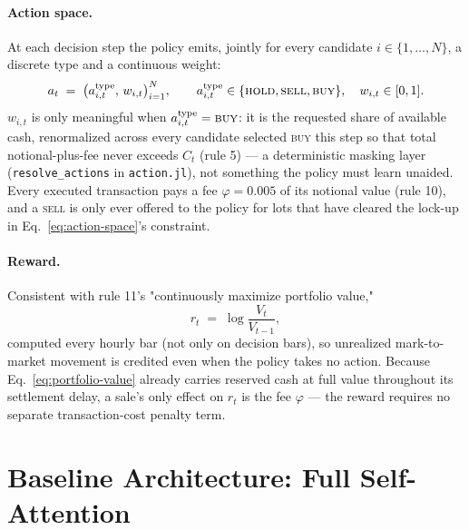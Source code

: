 \documentclass[11pt]{article}
\newcommand{\code}[1]{\texttt{#1}}
\begin{document}
\paragraph{Action space.} At each decision step the policy emits, jointly
for every candidate $i \in \{1,\dots,N\}$, a discrete type and a continuous
weight:
\begin{equation}
  a_t \;=\; \big(a^{\text{type}}_{i,t},\, w_{i,t}\big)_{i=1}^{N},
  \qquad a^{\text{type}}_{i,t} \in \{\textsc{hold},\textsc{sell},\textsc{buy}\},
  \quad w_{i,t}\in[0,1].
  \label{eq:action-space}
\end{equation}
$w_{i,t}$ is only meaningful when $a^{\text{type}}_{i,t}=\textsc{buy}$: it is
the requested share of available cash, renormalized across every
candidate selected \textsc{buy} this step so that total notional-plus-fee
never exceeds $C_t$ (rule 5) --- a deterministic masking layer
(\code{resolve\_actions} in \code{action.jl}), not something the policy must
learn unaided. Every executed transaction pays a fee
$\varphi=0.005$ of its notional value (rule 10), and a
\textsc{sell} is only ever offered to the policy for lots that have cleared
the lock-up in Eq.~\eqref{eq:action-space}'s constraint.

\paragraph{Reward.} Consistent with rule 11's "continuously maximize
portfolio value,"
\begin{equation}
  r_t \;=\; \log\!\frac{V_t}{V_{t-1}},
  \label{eq:reward}
\end{equation}
computed every hourly bar (not only on decision bars), so unrealized
mark-to-market movement is credited even when the policy takes no action.
Because Eq.~\eqref{eq:portfolio-value} already carries reserved cash at full
value throughout its settlement delay, a sale's only effect on $r_t$ is the
fee $\varphi$ --- the reward requires no separate transaction-cost penalty
term.

\section{Baseline Architecture: Full Self-Attention}
\label{sec:baseline}
\end{document}
